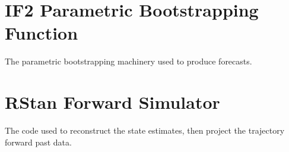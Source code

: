 \documentclass[12pt]{article}
\begin{document}
\newpage
\begin{appendices}

	\section{IF2 Parametric Bootstrapping Function}

	    The parametric bootstrapping machinery used to produce forecasts.

	    

	\section{RStan Forward Simulator}

	    The code used to reconstruct the state estimates, then project the trajectory forward past data.

	    

\end{appendices}
\end{document}

